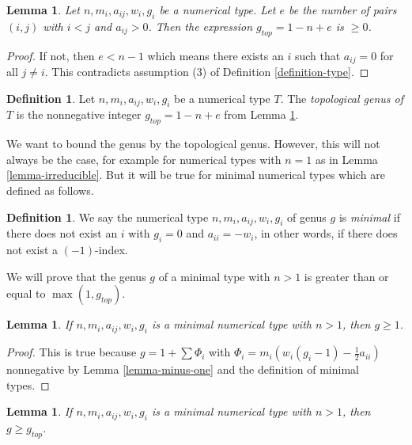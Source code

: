 \documentclass{stacks-project}
\theoremstyle{plain}
\newtheorem{lemma}[subsection]{Lemma}
\theoremstyle{definition}
\newtheorem{definition}[subsection]{Definition}
\theoremstyle{remark}
\numberwithin{equation}{subsection}
\begin{document}
\begin{lemma}
\label{lemma-top-genus}
Let $n, m_i, a_{ij}, w_i, g_i$ be a numerical type.
Let $e$ be the number of pairs $(i, j)$ with $i < j$ and $a_{ij} > 0$.
Then the expression $g_{top} = 1 - n + e$ is $\geq 0$.
\end{lemma}

\begin{proof}
If not, then $e < n - 1$ which means there exists an $i$ such that
$a_{ij} = 0$ for all $j \not = i$. This contradicts assumption
(3) of Definition \ref{definition-type}.
\end{proof}

\begin{definition}
\label{definition-top-genus}
Let $n, m_i, a_{ij}, w_i, g_i$ be a numerical type $T$. The
{\it topological genus of $T$} is the nonnegative integer
$g_{top} = 1 - n + e$ from Lemma \ref{lemma-top-genus}.
\end{definition}

\noindent
We want to bound the genus by the topological genus. However, this
will not always be the case, for example for numerical types
with $n = 1$ as in Lemma \ref{lemma-irreducible}. But it will
be true for minimal numerical types which are defined as follows.

\begin{definition}
\label{definition-type-minimal}
We say the numerical type $n, m_i, a_{ij}, w_i, g_i$ of genus $g$
is {\it minimal} if there does not exist an $i$
with $g_i = 0$ and $a_{ii} = -w_i$, in other words, if there
does not exist a $(-1)$-index.
\end{definition}

\noindent
We will prove that the genus $g$ of a minimal type with $n > 1$
is greater than or equal to $\max(1, g_{top})$.

\begin{lemma}
\label{lemma-non-irreducible-minimal-type-genus-at-least-one}
If $n, m_i, a_{ij}, w_i, g_i$ is a minimal numerical type
with $n > 1$, then $g \geq 1$.
\end{lemma}

\begin{proof}
This is true because $g = 1 + \sum \Phi_i$ with
$\Phi_i = m_i(w_i(g_i - 1) - \frac{1}{2} a_{ii})$ nonnegative
by Lemma \ref{lemma-minus-one} and the definition of minimal types.
\end{proof}

\begin{lemma}
\label{lemma-genus-nonnegative}
If $n, m_i, a_{ij}, w_i, g_i$ is a minimal numerical type
with $n > 1$, then $g \geq g_{top}$.
\end{lemma}
\end{document}
